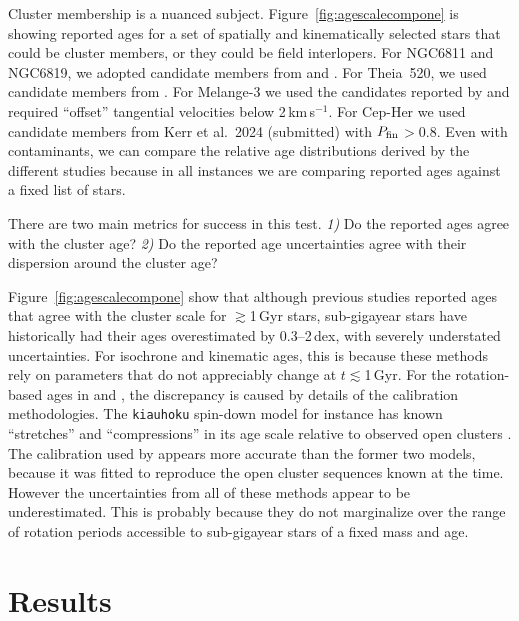 \documentclass[11pt,twocolumn,tighten,linenumbers]{aastex63}
\newcommand{\kms}{{km\,s$^{-1}$}}
\begin{document}
Cluster membership is a nuanced subject.
Figure~\ref{fig:agescalecompone} is showing reported ages for a set of
spatially and kinematically selected stars that could be cluster
members, or they could be field interlopers.  For NGC6811 and NGC6819,
we adopted candidate members from
\citet{2018A&A...618A..93C,CantatGaudin_2020} and
\citet{Kounkel_2020}.  For Theia~520, we used candidate members from
\citet{Kounkel_2020}.  For Melange-3 we used the candidates reported
by \citet{Barber_2022} and required ``offset'' tangential velocities
below 2\,\kms.  For Cep-Her we used candidate members from Kerr et
al.~2024 (submitted) with $P_{\rm fin}$$>$0.8.  Even with
contaminants, we can compare the relative age distributions derived by
the different studies because in all instances we are comparing
reported ages against a fixed list of stars.

There are two main metrics for success in this test. {\it 1)} Do the
reported ages agree with the cluster age? {\it 2)} Do the reported age
uncertainties agree with their dispersion around the cluster age?

Figure~\ref{fig:agescalecompone} show that although previous studies
reported ages that agree with the cluster scale for $\gtrsim$1\,Gyr
stars, sub-gigayear stars have historically had their ages
overestimated by 0.3--2\,dex, with severely understated uncertainties.
For isochrone and kinematic ages, this is because these methods rely
on parameters that do not appreciably change at $t$$\lesssim$1\,Gyr.
For the rotation-based ages in \citet{2023ApJ...952..131M} and
\citet{2024AJ....167..159L}, the discrepancy is caused by details of
the calibration methodologies.  The \texttt{kiauhoku} spin-down model
for instance has known ``stretches'' and ``compressions'' in its age
scale relative to observed open clusters \citep[see][Sec.
7.3]{2023ApJ...952..131M}.  The \citet{Mamajek_2008} calibration used
by \citet{Reinhold_2015} appears more accurate than the former two
models, because it was fitted to reproduce the open cluster sequences
known at the time.  However the uncertainties from all of these
methods appear to be underestimated.  This is probably because they do
not marginalize over the range of rotation periods accessible to
sub-gigayear stars of a fixed mass and age.



\section{Results}
\label{sec:results}
\end{document}
